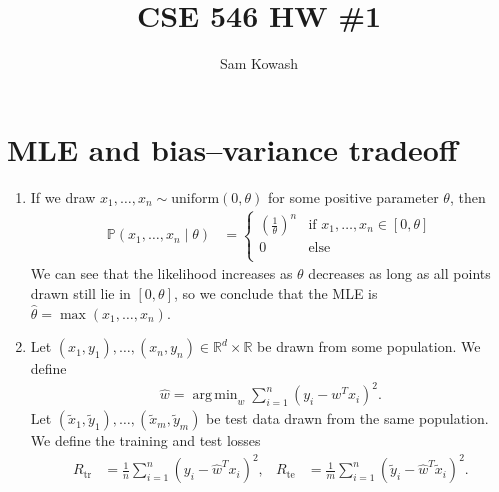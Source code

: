 \documentclass[11pt,letterpaper]{article}
\author{Sam Kowash}
\title{CSE 546 HW \#1}
\DeclareMathOperator*{\argmin}{arg\,min}
\numberwithin{equation}{section}
\numberwithin{figure}{section}
\begin{document}
\maketitle


\section{MLE and bias--variance tradeoff}
\begin{enumerate}
	\item If we draw $x_1,\ldots,x_n \sim \text{uniform}(0,\theta)$ for some positive parameter $\theta$, then
	\begin{align*}
		\mathbb{P}(x_1,\ldots,x_n \mid \theta) &= \left\{\begin{array}{ll}
			\left(\frac{1}{\theta}\right)^n & \text{if } x_1,\ldots,x_n \in [0,\theta]\\
			0 & \text{else}\\
			\end{array}\right.
	\end{align*}
	We can see that the likelihood increases as $\theta$ decreases as long as all points drawn still lie in $[0,\theta]$, so we conclude that the MLE is $\hat{\theta} = \max(x_1,\ldots,x_n)$.




	\item Let $(x_1,y_1),\ldots,(x_n,y_n) \in \mathbb{R}^d \times \mathbb{R}$ be drawn from some population. We define
	\begin{align*}
	\hat{w} = \argmin_{w} \sum_{i=1}^n (y_i - w^T x_i)^2.
	\end{align*}
	Let $(\tilde{x}_1,\tilde{y}_1),\ldots,(\tilde{x}_m,\tilde{y}_m)$ be test data drawn from the same population. We define the training and test losses
	\begin{align*}
		R_\mathrm{tr} &= \frac{1}{n} \sum_{i=1}^n \left(y_i - \hat{w}^T x_i\right)^2,&
		R_\mathrm{te} &= \frac{1}{m} \sum_{i=1}^n \left(\tilde{y}_i - \hat{w}^T \tilde{x}_i\right)^2.
	\end{align*}
\end{enumerate}
\end{document}
